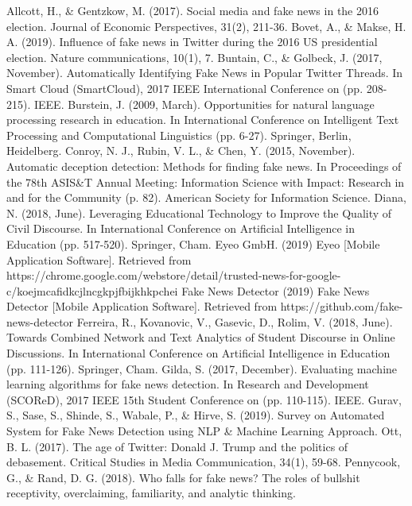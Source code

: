 \documentclass[12pt, final]{article}
\begin{document}
  \begin{thebibliography}{1}
   Allcott, H., \& Gentzkow, M. (2017). Social media and fake news in the 2016 election. Journal of Economic Perspectives, 31(2), 211-36.
   Bovet, A., \& Makse, H. A. (2019). Influence of fake news in Twitter during the 2016 US presidential election. Nature communications, 10(1), 7.
   Buntain, C., \& Golbeck, J. (2017, November). Automatically Identifying Fake News in Popular Twitter Threads. In Smart Cloud (SmartCloud), 2017 IEEE International Conference on (pp. 208-215). IEEE.
   Burstein, J. (2009, March). Opportunities for natural language processing research in education. In International Conference on Intelligent Text Processing and Computational Linguistics (pp. 6-27). Springer, Berlin, Heidelberg.
   Conroy, N. J., Rubin, V. L., \& Chen, Y. (2015, November). Automatic deception detection: Methods for finding fake news. In Proceedings of the 78th ASIS\&T Annual Meeting: Information Science with Impact: Research in and for the Community (p. 82). American Society for Information Science.
    Diana, N. (2018, June). Leveraging Educational Technology to Improve the Quality of Civil Discourse. In International Conference on Artificial Intelligence in Education (pp. 517-520). Springer, Cham.
    Eyeo GmbH. (2019) Eyeo [Mobile Application Software]. Retrieved from https://chrome.google.com/webstore/detail/trusted-news-for-google-c/koejmcafidkcjlncgkpjfbijkhkpchei
    Fake News Detector (2019) Fake News Detector [Mobile Application Software]. Retrieved from https://github.com/fake-news-detector
    Ferreira, R., Kovanovic, V., Gasevic, D., Rolim, V. (2018, June). Towards Combined Network and Text Analytics of Student Discourse in Online Discussions. In International Conference on Artificial Intelligence in Education (pp. 111-126). Springer, Cham.
    Gilda, S. (2017, December). Evaluating machine learning algorithms for fake news detection. In Research and Development (SCOReD), 2017 IEEE 15th Student Conference on (pp. 110-115). IEEE.
     Gurav, S., Sase, S., Shinde, S., Wabale, P., \& Hirve, S. (2019). Survey on Automated System for Fake News Detection using NLP \& Machine Learning Approach.
     Ott, B. L. (2017). The age of Twitter: Donald J. Trump and the politics of debasement. Critical Studies in Media Communication, 34(1), 59-68.
     Pennycook, G., \& Rand, D. G. (2018). Who falls for fake news? The roles of bullshit receptivity, overclaiming, familiarity, and analytic thinking.

\end{thebibliography}
\end{document}
